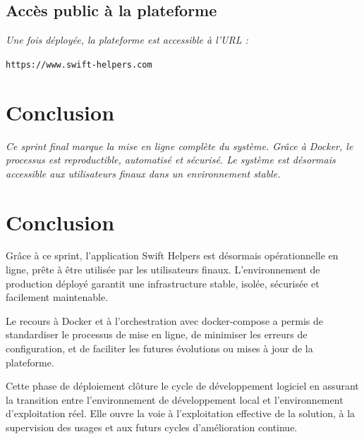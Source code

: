 \subsection*{Accès public à la plateforme}
\textit{Une fois déployée, la plateforme est accessible à l’URL :}

\begin{center}
\texttt{https://www.swift-helpers.com}
\end{center}

\section*{Conclusion}
\textit{Ce sprint final marque la mise en ligne complète du système. Grâce à Docker, le processus est reproductible, automatisé et sécurisé. Le système est désormais accessible aux utilisateurs finaux dans un environnement stable.}

\section*{Conclusion}

Grâce à ce sprint, l’application Swift Helpers est désormais opérationnelle en ligne, prête à être utilisée par les utilisateurs finaux. L’environnement de production déployé garantit une infrastructure stable, isolée, sécurisée et facilement maintenable.

Le recours à Docker et à l’orchestration avec docker-compose a permis de standardiser le processus de mise en ligne, de minimiser les erreurs de configuration, et de faciliter les futures évolutions ou mises à jour de la plateforme.

Cette phase de déploiement clôture le cycle de développement logiciel en assurant la transition entre l’environnement de développement local et l’environnement d’exploitation réel. Elle ouvre la voie à l’exploitation effective de la solution, à la supervision des usages et aux futurs cycles d’amélioration continue.

